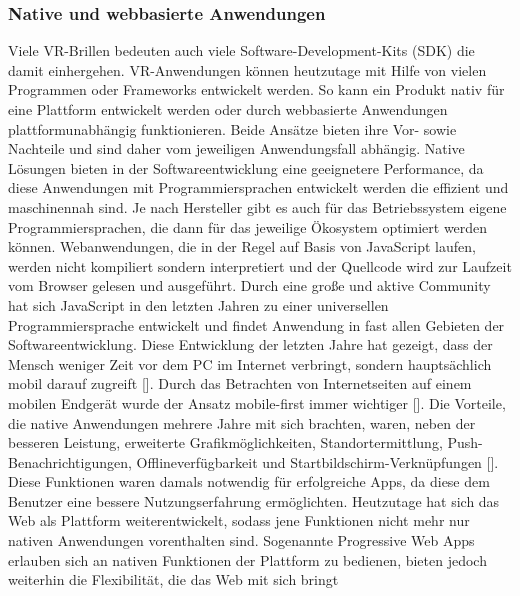 \documentclass[a4paper,12pt,oneside]{article}
\begin{document}
      \subsubsection{Native und webbasierte Anwendungen}
        Viele VR-Brillen bedeuten auch viele Software-Development-Kits (SDK) die damit einhergehen. 
        VR-Anwendungen können heutzutage mit Hilfe von vielen Programmen oder Frameworks entwickelt
        werden. So kann ein Produkt nativ für eine Plattform entwickelt werden oder durch
        webbasierte Anwendungen plattformunabhängig funktionieren.
        Beide Ansätze bieten ihre Vor- sowie Nachteile und sind daher vom jeweiligen 
        Anwendungsfall abhängig.
        Native Lösungen bieten in der Softwareentwicklung eine geeignetere
        Performance, da diese Anwendungen mit Programmiersprachen entwickelt werden die
        effizient und maschinennah sind. Je nach Hersteller gibt es auch für das 
        Betriebssystem eigene Programmiersprachen, die dann für das jeweilige Ökosystem 
        optimiert werden können.
        Webanwendungen, die in der Regel auf Basis von JavaScript laufen, werden nicht 
        kompiliert sondern interpretiert und der Quellcode wird zur Laufzeit vom Browser 
        gelesen und ausgeführt.
        Durch eine große und aktive Community hat sich JavaScript in den letzten Jahren 
        zu einer universellen Programmiersprache entwickelt und findet Anwendung in
        fast allen Gebieten der Softwareentwicklung.
        Diese Entwicklung der letzten Jahre hat gezeigt, dass der Mensch weniger
        Zeit vor dem PC im Internet verbringt, sondern hauptsächlich mobil darauf zugreift 
        [\cite[1]{Ater2017}].
        Durch das Betrachten von Internetseiten auf einem mobilen Endgerät wurde der
        Ansatz mobile-first immer wichtiger [\cite[1]{Ater2017}]. Die Vorteile, die native
        Anwendungen mehrere Jahre mit sich brachten, waren, neben der besseren Leistung,
        erweiterte Grafikmöglichkeiten, Standortermittlung, Push-Benachrichtigungen,
        Offlineverfügbarkeit und Startbildschirm-Verknüpfungen [\cite[3]{Ater2017}]. Diese
        Funktionen waren damals notwendig für erfolgreiche Apps, da diese dem
        Benutzer eine bessere Nutzungserfahrung ermöglichten. 
        Heutzutage hat sich das Web als Plattform weiterentwickelt, sodass jene Funktionen nicht
        mehr nur nativen Anwendungen vorenthalten sind.
        Sogenannte Progressive Web Apps erlauben sich an nativen Funktionen der Plattform zu
        bedienen, bieten jedoch weiterhin die Flexibilität, die das Web mit sich bringt
\end{document}
